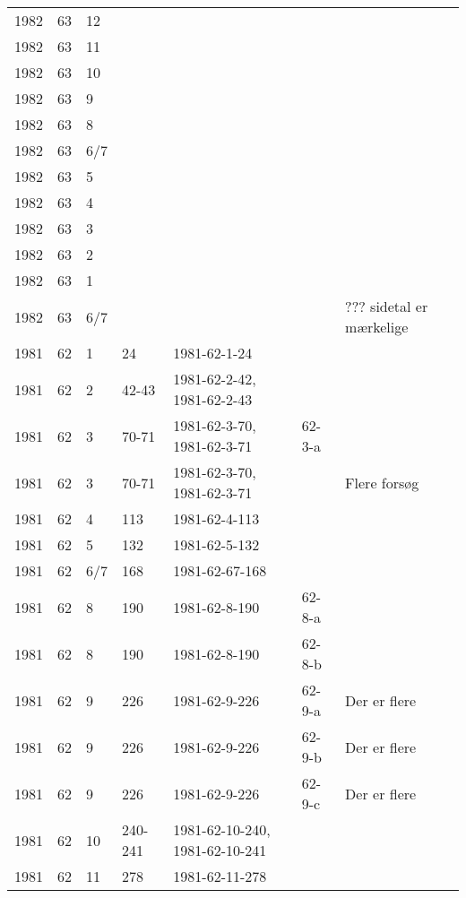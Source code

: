 \begin{longtable}{ |l|l|l|l|p{2.7cm}|l|p{2cm}| }
 1982 & 63 &    12 &         &                &  & \\
 1982 & 63 &    11 &         &                &  & \\
 1982 & 63 &    10 &         &                &  & \\
 1982 & 63 &     9 &         &                &  & \\
 1982 & 63 &     8 &         &                &  & \\
 1982 & 63 &   6/7 &         &                &  & \\
 1982 & 63 &     5 &         &                &  & \\
 1982 & 63 &     4 &         &                &  & \\
 1982 & 63 &     3 &         &                &  & \\
 1982 & 63 &     2 &         &                &  & \\
 1982 & 63 &     1 &         &                &  & \\
 1982 & 63 &   6/7 &         &                &  & ??? sidetal er mærkelige \\
 1981 & 62 &     1 &      24 &   1981-62-1-24 &  & \\
 1981 & 62 &     2 &   42-43 & 1981-62-2-42, 1981-62-2-43 &  & \\
 1981 & 62 &     3 &   70-71 & 1981-62-3-70, 1981-62-3-71 & 62-3-a & \\
 1981 & 62 &   3 &   70-71 & 1981-62-3-70, 1981-62-3-71 &  & Flere forsøg \\
 1981 & 62 &     4 &     113 &  1981-62-4-113 &  & \\
 1981 & 62 &     5 &     132 &  1981-62-5-132 &  & \\
 1981 & 62 &   6/7 &     168 & 1981-62-67-168 &  & \\
 1981 & 62 &     8 &     190 &  1981-62-8-190 & 62-8-a & \\
 1981 & 62 &     8 &     190 &  1981-62-8-190 & 62-8-b & \\
 1981 & 62 &     9 &     226 &  1981-62-9-226 &  62-9-a & Der er flere \\
 1981 & 62 &     9 &     226 &  1981-62-9-226 &  62-9-b & Der er flere \\
 1981 & 62 &     9 &     226 &  1981-62-9-226 &  62-9-c & Der er flere \\
 1981 & 62 &    10 & 240-241 & 1981-62-10-240, 1981-62-10-241 &  & \\
 1981 & 62 &    11 &     278 & 1981-62-11-278 &  & \\

\end{longtable}
